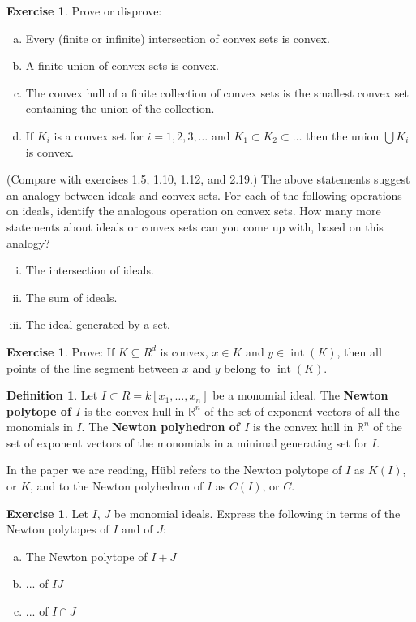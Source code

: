 \documentclass{amsart}
\theoremstyle{plain}
\theoremstyle{definition}
\newtheorem{definition}{Definition}
\newtheorem{exercise}[theorem]{Exercise}
\theoremstyle{definition}
\newcommand{\defining}[1]{\textbf{#1}}
\newcommand{\R}{\mathbb{R}}
\DeclareMathOperator{\interior}{int}
\begin{document}
\begin{exercise}
Prove or disprove:
\begin{enumerate}[a.]
\item Every  (finite or infinite) intersection of convex sets is convex.
\item A finite union of convex sets is convex.
\item The convex hull of a finite collection of convex sets is the smallest convex set
containing the union of the collection.
\item If $K_i$ is a convex set for $i=1,2,3,\dots$ and $K_1 \subset K_2 \subset \dots$
then the union $\bigcup K_i$ is convex.
\end{enumerate}
(Compare with exercises 1.5, 1.10, 1.12, and 2.19.)
The above statements suggest an analogy between ideals and convex sets.
For each of the following operations on ideals, identify the analogous operation on convex sets.
How many more statements about ideals or convex sets can you come up with, based on this analogy?
\begin{enumerate}[i.]
\item The intersection of ideals.
\item The sum of ideals.
\item The ideal generated by a set.
\end{enumerate}
\end{exercise}


\begin{exercise}
Prove:
If $K \subseteq R^d$ is convex, $x \in K$ and $y \in \interior(K)$, then all points of the line segment between $x$ and $y$ belong to $\interior(K)$.
\end{exercise}


\begin{definition}
Let $I \subset R = k[x_1,\dots,x_n]$ be a monomial ideal.
The \defining{Newton polytope of $I$} is the convex hull in $\R^n$ of the set
of exponent vectors of all the monomials in $I$.
The \defining{Newton polyhedron of $I$} is the convex hull in $\R^n$ of the set
of exponent vectors of the monomials in a minimal generating set for $I$.

In the paper we are reading, H\"ubl refers to the Newton polytope of $I$ as $K(I)$, or $K$,
and to the Newton polyhedron of $I$ as $C(I)$, or $C$.
\end{definition}


\begin{exercise}
Let $I$, $J$ be monomial ideals.
Express the following in terms of the Newton polytopes of $I$ and of $J$:
\begin{enumerate}[a.]
\item The Newton polytope of $I+J$
\item ... of $I J$
\item ... of $I \cap J$
\end{enumerate}
\end{exercise}
\end{document}

